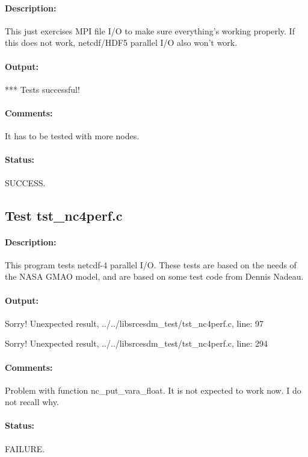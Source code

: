 \paragraph{Description:} This just exercises MPI file I/O to make sure everything's working properly. If this does not work, netcdf/HDF5 parallel I/O also won't work.

\paragraph{Output:} *** Tests successful!

\paragraph{Comments:} It has to be tested with more nodes.

\paragraph{Status:} SUCCESS.

\subsection{Test tst\_nc4perf.c}

\paragraph{Description:} This program tests netcdf-4 parallel I/O. These tests are based on the needs of the NASA GMAO model, and are based on some test code from Dennis Nadeau.

\paragraph{Output:} Sorry! Unexpected result, ../../libsrcesdm\_test/tst\_nc4perf.c, line: 97

Sorry! Unexpected result, ../../libsrcesdm\_test/tst\_nc4perf.c, line: 294

\paragraph{Comments:} Problem with function nc\_put\_vara\_float. It is not expected to work now. I do not recall why.

\paragraph{Status:} FAILURE.

